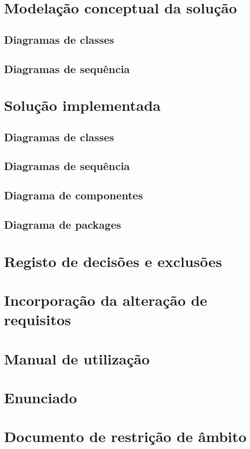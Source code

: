 \documentclass[a4paper,11pt]{article}
\begin{document}
\section{Modelação conceptual da solução}
\subsection{Diagramas de classes}
\subsection{Diagramas de sequência}

\section{Solução implementada}
\subsection{Diagramas de classes}
\subsection{Diagramas de sequência}
\subsection{Diagrama de componentes}
\subsection{Diagrama de packages}

\section{Registo de decisões e exclusões}

\section{Incorporação da alteração de requisitos}

\section{Manual de utilização}

\appendix
\section{Enunciado}
% 
\section{Documento de restrição de âmbito}
% 
\end{document}
